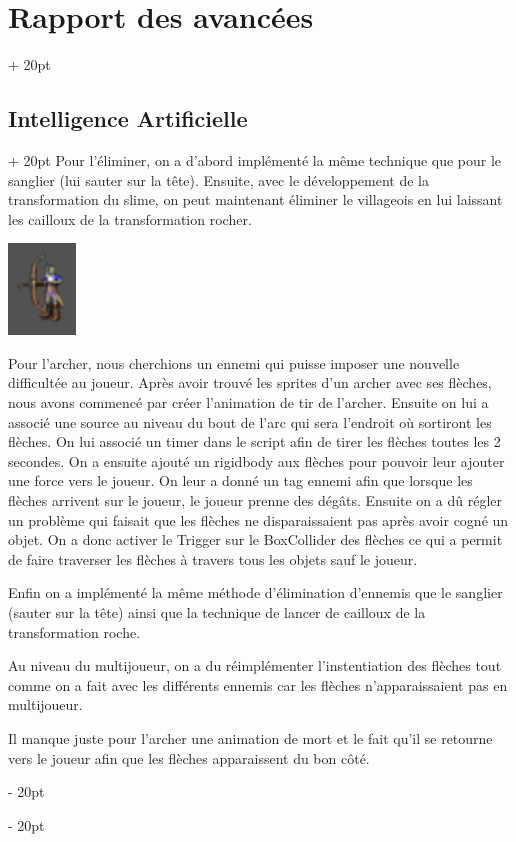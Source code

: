 \documentclass[a4paper, 12pt, twoside]{article}
\newcommand{\ind}[1][20pt]{\advance\leftskip + #1}
\newcommand{\deind}[1][20pt]{\advance\leftskip - #1}
\newenvironment{indt}[2][20pt]{#2 \par \ind[#1]}{\par \deind} %
\begin{document}
\begin{indt}{\section{Rapport des avancées}}
\begin{indt}{\subsection{Intelligence Artificielle}}
            Pour l'éliminer, on a d'abord implémenté la même technique que pour le sanglier (lui sauter sur la tête). Ensuite, avec le développement de la transformation du slime, on peut maintenant éliminer le villageois en lui laissant les cailloux de la transformation rocher.

            \begin{center}
                \includegraphics[width=0.2\linewidth]{archer.png}
            \end{center}

            Pour l'archer, nous cherchions un ennemi qui puisse imposer une nouvelle difficultée au joueur. Après avoir trouvé les sprites d'un archer avec ses flèches, nous avons commencé par créer l'animation de tir de l'archer. Ensuite on lui a associé une source au niveau du bout de l'arc qui sera l'endroit où sortiront les flèches. On lui associé un timer dans le script afin de tirer les flèches toutes les 2 secondes. On a ensuite ajouté un rigidbody aux flèches pour pouvoir leur ajouter une force vers le joueur. On leur a donné un tag ennemi afin que lorsque les flèches arrivent sur le joueur, le joueur prenne des dégâts.  Ensuite on a dû régler un problème qui faisait que les flèches ne disparaissaient pas après avoir cogné un objet. On a donc activer le Trigger sur le BoxCollider des flèches ce qui a permit de faire traverser les flèches à travers tous les objets sauf le joueur.

            Enfin on a implémenté la même méthode d'élimination d'ennemis que le sanglier (sauter sur la tête) ainsi que la technique de lancer de cailloux de la transformation roche.

            Au niveau du multijoueur, on a du réimplémenter l'instentiation des flèches tout comme on a fait avec les différents ennemis car les flèches n'apparaissaient pas en multijoueur.

            Il manque juste pour l'archer une animation de mort et le fait qu'il se retourne vers le joueur afin que les flèches apparaissent du bon côté.


\end{indt}
\end{indt}
\end{document}
